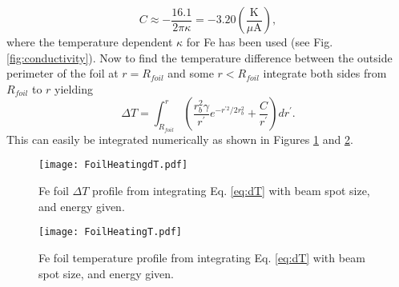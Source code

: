 \documentclass[12pt]{article}
\begin{document}
\[
C\approx-\frac{16.1}{2\pi\kappa}=-3.20\left(\frac{\textrm{K}}{\mu\textrm{A}}\right),
\]
where the temperature dependent $\kappa$ for Fe has been used (see Fig. \ref{fig:conductivity}). Now to find the temperature difference between the outside perimeter of the foil at $r=R_{foil}$ and some $r<R_{foil}$ integrate both sides from $R_{foil}$ to $r$ yielding
\begin{equation}
\label{eq:dT}
\Delta T = \int_{R_{foil}}^r \left(\frac{r_b^2\gamma}{r^{\prime}} e^{-r^{\prime 2}/2r_b^2}+\frac{C}{r^{\prime}}\right)dr^{\prime}.
\end{equation}
This can easily be integrated numerically as shown in Figures  \ref{fig:foilheating} and \ref{fig:foilheatingT}.
\begin{figure}[h]
\centering
\texttt{[image: FoilHeatingdT.pdf]}
\caption{\label{fig:foilheating}Fe foil $\Delta T$ profile from integrating Eq. \ref{eq:dT} with beam spot size, and energy given.}
\end{figure}
\begin{figure}[h]
\centering
\texttt{[image: FoilHeatingT.pdf]}
\caption{\label{fig:foilheatingT}Fe foil temperature profile from integrating Eq. \ref{eq:dT} with beam spot size, and energy given.}
\end{figure}
\end{document}
